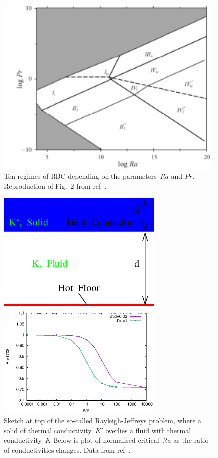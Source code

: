 \begin{figure}
\centerline{\includegraphics[width=12cm]{../png/Gr00Scal-f2}}
\caption{Ten regimes of RBC depending on the parameters~$Ra$ and $Pr$.
Reproduction of Fig.~2 from ref~\cite{Gr00Scal}. \label{fig:grossmanlohse}}
\end{figure}
\begin{figure}
\centerline{\includegraphics[width=8cm]{../png/RJsl}}
\centerline{\includegraphics[width=8cm]{../png/rcr2}}
\caption{
Sketch at top of the so-called Rayleigh-Jeffreys problem, where a solid
of thermal conductivity~$K'$ overlies a fluid with thermal conductivity~$K$
Below is plot of normalised critical~$Ra$ as the ratio of conductivities changes.
Data from ref~\cite{Ni68Rayl}. \label{fig:nield}}
\end{figure}
